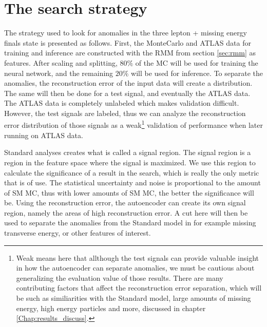 \section{The search strategy}\label{sec:strategy}
The strategy used to look for anomalies in the three lepton + missing energy finals state is presented as follows. 
First, the MonteCarlo and ATLAS data 
for training and inference are constructed with the RMM from section \ref{sec:rmm} as features. After scaling and 
splitting, $80\%$ of the MC will be used for 
training the neural network, and the remaining $20\%$ will be used for inference. To separate the anomalies, the 
reconstruction error of the input data 
will create a distribution. The same will then be done for a test signal, and eventually the ATLAS data. The 
ATLAS data is completely unlabeled which 
makes validation difficult. However, the test signals are labeled, thus we can analyze the reconstruction error 
distribution of those signals as a 
weak\footnote{Weak means here that allthough the test signals can provide valuable insight in how the autoencoder 
can separate anomalies,
 we must be cautious about generalizing the evaluation value of those results. There are many contributing factors 
 that affect the reconstruction error separation, 
 which will be such as similiarities with the Standard model, large amounts of missing energy, high energy particles 
 and more,  discussed in chapter \ref{Chap:results_discuss}. } 
 validation of performance when later running on ATLAS data. 
 
Standard analyses creates what is called a signal region. The signal region is a region in the feature space where 
the signal is maximized. We use this region to calculate the 
significance of a result in the search, which is really the only metric that is of use. The statistical uncertainty 
and noise is proportional to the amount of SM MC, thus
with lower amounts of SM MC, the better the significance will be. Using the reconstruction error, the autoencoder 
can create its own signal region, 
namely the areas of high reconstruction error. A cut here will then be used to separate the anomalies from the 
Standard model in for example missing transverse energy, or 
other features of interest. \par 

